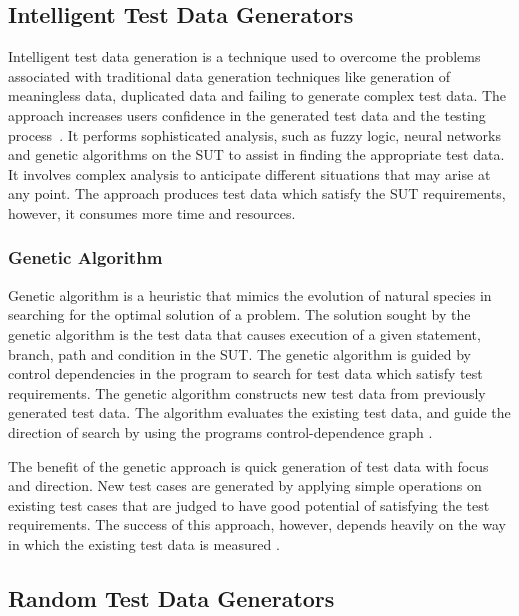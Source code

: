 

\subsection{Intelligent Test Data Generators}
 Intelligent test data generation is a technique used to overcome the problems associated with traditional data generation techniques like generation of meaningless data, duplicated data and failing to generate complex test data. The approach increases users confidence in the generated test data and the testing process~\cite{ramamoorthy1975testing}. It performs sophisticated analysis, such as fuzzy logic, neural networks and genetic algorithms on the SUT to assist in finding the appropriate test data. It involves complex analysis to anticipate different situations that may arise at any point. The approach produces test data which satisfy the SUT requirements, however, it consumes more time and resources.

\subsubsection{Genetic Algorithm}
Genetic algorithm is a heuristic that mimics the evolution of natural species in searching for the optimal solution of a problem. The solution sought by the genetic algorithm is the test data that causes execution of a given statement, branch, path and condition in the SUT. The genetic algorithm is guided by control dependencies in the program to search for test data which satisfy test requirements. The genetic algorithm constructs new test data from previously generated test data. The algorithm evaluates the existing test data, and guide the direction of search by using the programs control-dependence graph \cite{pargas1999test}.

The benefit of the genetic approach is quick generation of test data with focus and direction. New test cases are generated by applying simple operations on existing test cases that are judged to have good potential of satisfying the test requirements. The success of this approach, however, depends heavily on the way in which the existing test data is measured \cite{pargas1999test}.


\subsection{Random Test Data Generators}

